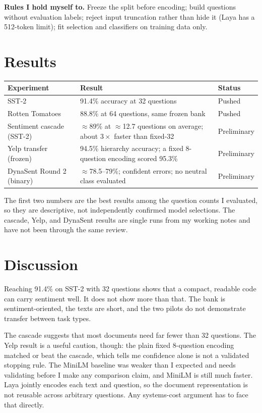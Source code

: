 \textbf{Rules I hold myself to.} Freeze the split before encoding; build questions without evaluation labels; reject input truncation rather than hide it (Laya has a 512-token limit); fit selection and classifiers on training data only.

\section{Results}
\begin{center}
\small
\begin{tabular}{@{}p{3.3cm}p{6.4cm}p{2.6cm}@{}}
\toprule
\textbf{Experiment} & \textbf{Result} & \textbf{Status}\\
\midrule
SST-2 & 91.4\% accuracy at 32 questions & Pushed\\
Rotten Tomatoes & 88.8\% at 64 questions, same frozen bank & Pushed\\
Sentiment cascade (SST-2) & $\approx$89\% at $\approx$12.7 questions on average; about $3\times$ faster than fixed-32 & Preliminary\\
Yelp transfer (frozen) & 94.5\% hierarchy accuracy; a fixed 8-question encoding scored 95.3\% & Preliminary\\
DynaSent Round 2 (binary) & $\approx$78.5--79\%; confident errors; no neutral class evaluated & Preliminary\\
\bottomrule
\end{tabular}
\end{center}
The first two numbers are the best results among the question counts I evaluated, so they are descriptive, not independently confirmed model selections. The cascade, Yelp, and DynaSent results are single runs from my working notes and have not been through the same review.

\section{Discussion}
Reaching 91.4\% on SST-2 with 32 questions shows that a compact, readable code can carry sentiment well. It does not show more than that. The bank is sentiment-oriented, the texts are short, and the two pilots do not demonstrate transfer between task types.

The cascade suggests that most documents need far fewer than 32 questions. The Yelp result is a useful caution, though: the plain fixed 8-question encoding matched or beat the cascade, which tells me confidence alone is not a validated stopping rule. The MiniLM baseline was weaker than I expected and needs validating before I make any comparison claim, and MiniLM is still much faster. Laya jointly encodes each text and question, so the document representation is not reusable across arbitrary questions. Any systems-cost argument has to face that directly.


